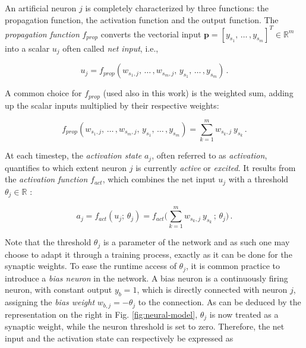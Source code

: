 \documentclass[longtitle]{elsarticle}
\numberwithin{equation}{section}
\theoremstyle{theorem}
\theoremstyle{definition}
\theoremstyle{remark}
\theoremstyle{proposition}
\numberwithin{figure}{section}
\begin{document}
		An artificial neuron $j$ is completely characterized by three functions: the propagation function, the activation function and the output function. The \emph{propagation function} $f_{prop}$ converts the vectorial input $\mathbf{p} = [y_{s_1}, \, \ldots \, , y_{s_m}]^T \in \mathbb{R}^m$ into a scalar $u_{j}$ often called \emph{net input}, i.e.,
		\begin{linenomath}\begin{equation*}
			u_{j} = f_{prop}(w_{s_1,j}, \, \ldots \, , w_{s_m,j}, \, y_{s_1}, \, \ldots \, , y_{s_m}) \, .
		\end{equation*}\end{linenomath}
		A common choice for $f_{prop}$ (used also in this work) is the weighted sum, adding up the scalar inputs multiplied by their respective weights:
		\begin{linenomath}\begin{equation*}
			f_{prop}(w_{s_1,j}, \, \ldots \, , w_{s_m,j}, \, y_{s_1}, \, \ldots \, , y_{s_m}) = \sum_{k = 1}^m w_{s_k,j} ~ y_{s_k} \, .
		\end{equation*}\end{linenomath} 
		At each timestep, the \emph{activation state} $a_j$, often referred to as \emph{activation}, quantifies to which extent neuron $j$ is currently \emph{active} or \emph{excited}. It results from the \emph{activation function} $f_{act}$, which combines the net input $u_j$ with a threshold $\theta_j \in \mathbb{R}$ \cite{Kri07}: 
		\begin{linenomath}\begin{equation*}
			a_j = f_{act}(u_j; \, \theta_j) = f_{act} \big( \sum_{k = 1}^m w_{s_k,j} ~ y_{s_k} \, ; \, \theta_j \big) \, .
		\end{equation*}\end{linenomath}
		Note that the threshold $\theta_j$ is a parameter of the network and as such one may choose to adapt it through a training process, exactly as it can be done for the synaptic weights. To ease the runtime access of $\theta_j$, it is common practice to introduce a \emph{bias neuron} in the network. A bias neuron is a continuously firing neuron, with constant output $y_{b} = 1$, which is directly connected with neuron $j$, assigning the \emph{bias weight} $w_{b,j} = - \theta_j$ to the connection. As can be deduced by the representation on the right in Fig. \ref{fig:neural-model}, $\theta_j$ is now treated as a synaptic weight, while the neuron threshold is set to zero. Therefore, the net input and the activation state can respectively be expressed as
\end{document}
